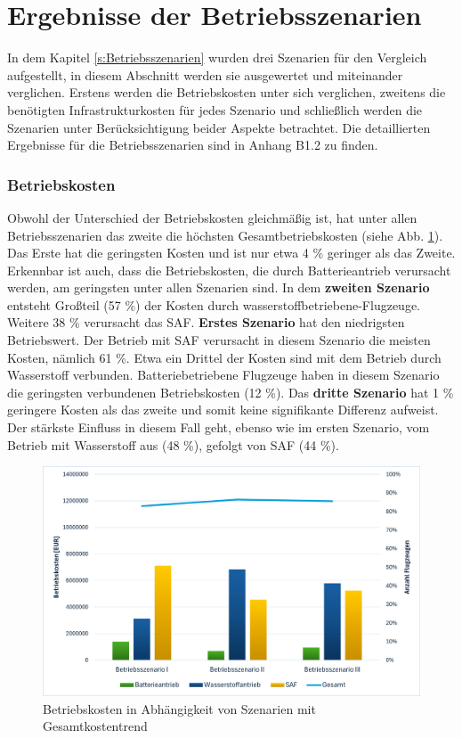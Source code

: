 \section{Ergebnisse der Betriebsszenarien}
In dem Kapitel \ref{s:Betriebsszenarien} wurden drei Szenarien für den Vergleich aufgestellt, 
in diesem Abschnitt werden sie ausgewertet und miteinander verglichen. 
Erstens werden die Betriebskosten unter sich verglichen, 
zweitens die benötigten Infrastrukturkosten für jedes Szenario und schließlich 
werden die Szenarien unter Berücksichtigung beider Aspekte betrachtet. 
Die detaillierten Ergebnisse für die Betriebsszenarien sind in Anhang B1.2 zu finden.
%
\subsubsection{Betriebskosten}
Obwohl der Unterschied der Betriebskosten gleichmäßig ist, 
hat unter allen Betriebsszenarien das zweite die höchsten Gesamtbetriebskosten (siehe Abb. \ref{res_betriebsszenarien}). 
Das Erste hat die geringsten Kosten und ist nur etwa 4 \% geringer als das Zweite.
Erkennbar ist auch, dass die Betriebskosten, die durch Batterieantrieb verursacht werden, 
am geringsten unter allen Szenarien sind.
In dem \textbf{zweiten Szenario} entsteht Großteil (57 \%) der Kosten durch wasserstoffbetriebene-Flugzeuge. 
Weitere 38 \% verursacht das SAF.
\textbf{Erstes Szenario} hat den niedrigsten Betriebswert. 
Der Betrieb mit SAF verursacht in diesem Szenario die meisten Kosten, nämlich 61 \%.
Etwa ein Drittel der Kosten sind mit dem Betrieb durch Wasserstoff verbunden. Batteriebetriebene 
Flugzeuge haben in diesem Szenario die geringsten verbundenen Betriebskosten (12 \%).
Das \textbf{dritte Szenario} hat 1 \% geringere Kosten als das zweite und somit 
keine signifikante Differenz aufweist. 
Der stärkste Einfluss in diesem Fall geht, ebenso wie im ersten Szenario, 
vom Betrieb mit Wasserstoff aus (48 \%), gefolgt von SAF (44 \%).
%
\begin{figure}[h]
	\centering
	\includegraphics[width=0.8\linewidth]{Bilder/betriebssz_res.png}
	\caption[Betriebskosten in Abhängigkeit von Szenarien mit Gesamtkostentrend]{Betriebskosten in Abhängigkeit von Szenarien mit Gesamtkostentrend}
	\label{res_betriebsszenarien}
\end{figure}
%
